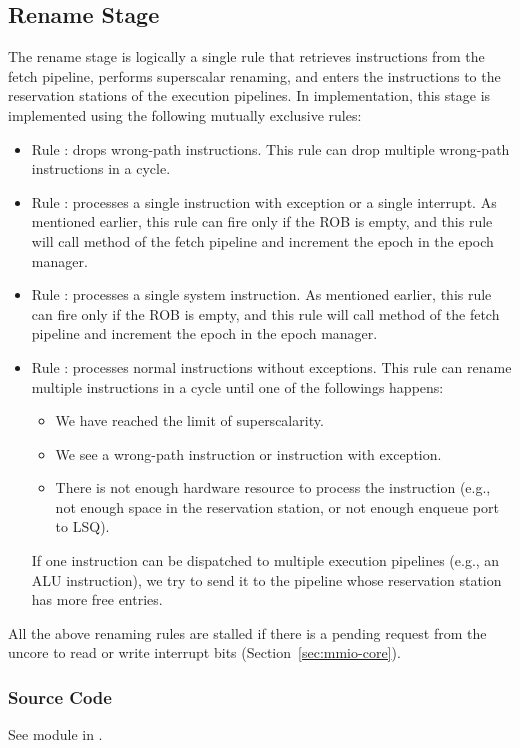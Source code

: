 \subsection{Rename Stage}

The rename stage is logically a single rule that retrieves instructions from the fetch pipeline, performs superscalar renaming, and enters the instructions to the reservation stations of the execution pipelines.
In implementation, this stage is implemented using the following mutually exclusive rules:
\begin{itemize}
    \item Rule : drops wrong-path instructions.
    This rule can drop multiple wrong-path instructions in a cycle.
    \item Rule : processes a single instruction with exception or a single interrupt.
    As mentioned earlier, this rule can fire only if the ROB is empty, and this rule will call method  of the fetch pipeline and increment the epoch in the epoch manager.
    \item Rule : processes a single system instruction.
    As mentioned earlier, this rule can fire only if the ROB is empty, and this rule will call method  of the fetch pipeline and increment the epoch in the epoch manager.
    \item Rule : processes normal instructions without exceptions.
    This rule can rename multiple instructions in a cycle until one of the followings happens:
    \begin{itemize}
        \item We have reached the limit of superscalarity.
        \item We see a wrong-path instruction or instruction with exception.
        \item There is not enough hardware resource to process the instruction (e.g., not enough space in the reservation station, or not enough enqueue port to LSQ).
    \end{itemize}
    If one instruction can be dispatched to multiple execution pipelines (e.g., an ALU instruction), we try to send it to the pipeline whose reservation station has more free entries.
\end{itemize}
All the above renaming rules are stalled if there is a pending request from the uncore to read or write interrupt bits (Section~\ref{sec:mmio-core}).

\subsubsection{Source Code}
See module  in .
